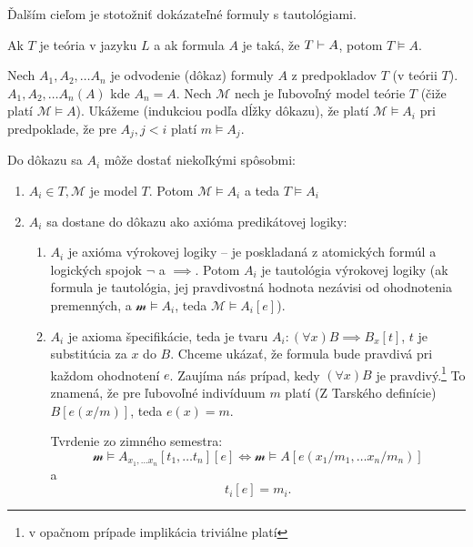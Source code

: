 Ďalším cieľom je stotožniť dokázateľné formuly s tautológiami.

\begin{veta}[o korektnosti]
    Ak $T$ je teória v jazyku $L$ a ak formula $A$ je taká,
    že $T \vdash A$, potom $T \models A$.
\end{veta}

\begin{dokaz}
    Nech $A_1, A_2, \ldots A_n$ je odvodenie (dôkaz) formuly $A$
    z predpokladov $T$ (v teórii $T$). $A_1, A_2, \ldots A_n(A)$ kde
    $A_n=A$. Nech $\mathcal{M}$ nech je ľubovoľný model teórie $T$ 
    (čiže platí $\mathcal{M} \models A$).
    Ukážeme (indukciou podľa dĺžky dôkazu), že platí $\mathcal{M} \models A_i$
    pri predpoklade, že pre $A_j, j < i$ platí $m \models A_j$.

    Do dôkazu sa $A_i$ môže dostať niekoľkými spôsobmi:
    \begin{enumerate}
    \item $A_i \in T, \mathcal{M}$ je model $T$. Potom 
        $\mathcal{M} \models A_i$ a teda $T \models A_i$

    \item $A_i$ sa dostane do dôkazu ako axióma predikátovej logiky:
    \begin{enumerate}
        \item $A_i$ je axióma výrokovej logiky -- je poskladaná z
            atomických formúl a logických spojok $\neg$ a $\implies$. Potom
            $A_i$ je tautológia výrokovej logiky (ak formula je tautológia,
            jej pravdivostná hodnota nezávisi od ohodnotenia premenných, a
            $\mathcal{m} \models A_i$, teda $\mathcal{M} \models A_i[e]$).

        \item $A_i$ je axioma špecifikácie, teda je tvaru 
            $A_i: (\forall x) B \implies B_x[t]$, 
            $t$ je substitúcia za $x$ do $B$. 
            Chceme ukázať, že formula bude pravdivá
            pri každom ohodnotení $e$.
            Zaujíma nás prípad, kedy $(\forall x) B$ je pravdivý.\footnote{
                v opačnom prípade implikácia triviálne platí}
            To znamená, že pre ľubovoľné indivíduum $m$ platí (Z Tarského
            definície) $B[e(x/m)]$, teda $e(x)=m$.
        
            Tvrdenie zo zimného semestra:
            \begin{equation*}
                \mathcal{m} \models A_{x_1, \ldots x_n}[t_1, \ldots t_n][e] 
                    \Leftrightarrow 
                \mathcal{m} \models A[e(x_1/m_1, \ldots x_n/m_n)]
            \end{equation*}
            a
            \begin{equation*}
              t_i[e] = m_i.
            \end{equation*}


\end{enumerate}
\end{enumerate}
\end{dokaz}
